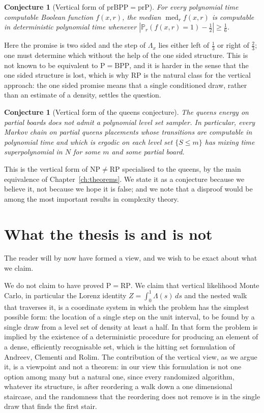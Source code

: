 \documentclass[11pt,twoside,openany]{book}
\theoremstyle{plain}
\newtheorem{conjecture}[theorem]{Conjecture}
\theoremstyle{definition}
\theoremstyle{remark}
\newcommand{\PP}{\mathbb{P}}
\newcommand{\RP}{\mathrm{RP}}
\newcommand{\BPP}{\mathrm{BPP}}
\newcommand{\NP}{\mathrm{NP}}
\newcommand{\Pc}{\mathrm{P}}
\begin{document}
\begin{conjecture}[Vertical form of $\mathrm{prBPP} = \mathrm{prP}$]
For every polynomial time computable Boolean function $f(x, r)$, the median $\operatorname{med}_r f(x, r)$ is computable in deterministic polynomial time whenever $|\PP_r(f(x,r) = 1) - \tfrac12| \ge \tfrac16$.
\end{conjecture}

Here the promise is two sided and the step of $\Lambda_x$ lies either left of $\tfrac13$ or right of $\tfrac23$; one must determine which without the help of the one sided structure. This is not known to be equivalent to $\Pc = \BPP$, and it is harder in the sense that the one sided structure is lost, which is why $\RP$ is the natural class for the vertical approach: the one sided promise means that a single conditioned draw, rather than an estimate of a density, settles the question.

\begin{conjecture}[Vertical form of the queens conjecture]
\label{conj:queens_vertical}
The queens energy on partial boards does not admit a polynomial level set sampler. In particular, every Markov chain on partial queens placements whose transitions are computable in polynomial time and which is ergodic on each level set $\{ S \le m \}$ has mixing time superpolynomial in $N$ for some $m$ and some partial board.
\end{conjecture}

This is the vertical form of $\NP \neq \RP$ specialised to the queens, by the main equivalence of Chapter~\ref{ch:theorems}. We state it as a conjecture because we believe it, not because we hope it is false; and we note that a disproof would be among the most important results in complexity theory.

\section{What the thesis is and is not}

The reader will by now have formed a view, and we wish to be exact about what we claim.

We do not claim to have proved $\Pc = \RP$. We claim that vertical likelihood Monte Carlo, in particular the Lorenz identity $Z = \int_0^1 \Lambda(s) \, ds$ and the nested walk that traverses it, is a coordinate system in which the problem has the simplest possible form: the location of a single step on the unit interval, to be found by a single draw from a level set of density at least a half. In that form the problem is implied by the existence of a deterministic procedure for producing an element of a dense, efficiently recognisable set, which is the hitting set formulation of Andreev, Clementi and Rolim. The contribution of the vertical view, as we argue it, is a viewpoint and not a theorem: in our view this formulation is not one option among many but a natural one, since every randomized algorithm, whatever its structure, is after reordering a walk down a one dimensional staircase, and the randomness that the reordering does not remove is in the single draw that finds the first stair.
\end{document}
